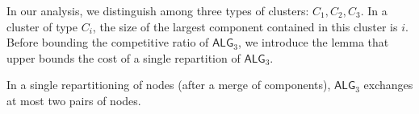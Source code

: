 \documentclass[a4paper,anonymous,USenglish]{lipics-v2019}
\newcommand{\TAlg}{{\ensuremath{\textsf{ALG}_{3}}}\xspace}
\begin{document}

In our analysis, we distinguish among three types of clusters: $C_1, C_2, C_3$. In a cluster of type $C_i$, the size of the largest component contained in this cluster is $i$.
Before bounding the competitive ratio of \TAlg, we introduce the lemma that upper bounds the cost of a single repartition of \TAlg.

\begin{lemma}
	\label{lem:1req}
	In a single repartitioning of nodes (after a merge of components), \TAlg exchanges at most two pairs of nodes.
\end{lemma}
\end{document}
